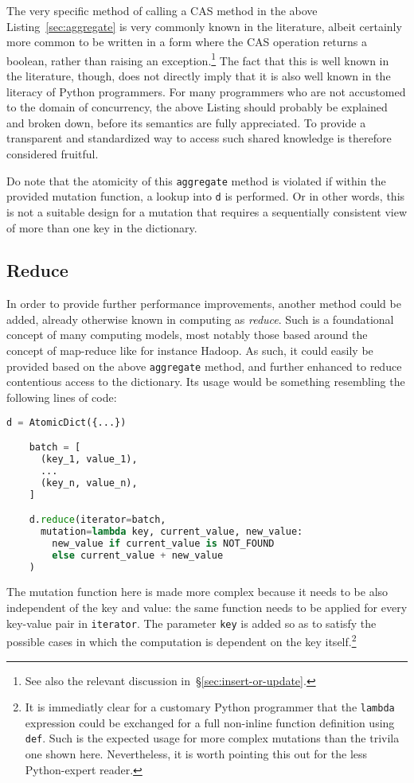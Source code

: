 The very specific method of calling a CAS method in the above Listing~\ref{sec:aggregate} is very commonly known in the literature, albeit certainly more common to be written in a form where the CAS operation returns a boolean, rather than raising an exception.\footnote{%
	See also the relevant discussion in~\S\ref{sec:insert-or-update}.
}
The fact that this is well known in the literature, though, does not directly imply that it is also well known in the literacy of Python programmers.
For many programmers who are not accustomed to the domain of concurrency, the above Listing should probably be explained and broken down, before its semantics are fully appreciated.
To provide a transparent and standardized way to access such shared knowledge is therefore considered fruitful.

Do note that the atomicity of this \texttt{aggregate} method is violated if within the provided mutation function, a lookup into \texttt{d} is performed.
Or in other words, this is not a suitable design for a mutation that requires a sequentially consistent view of more than one key in the dictionary.

\subsection{Reduce}\label{subsec:reduce}

In order to provide further performance improvements, another method could be added, already otherwise known in computing as \emph{reduce}.
Such is a foundational concept of many computing models, most notably those based around the concept of map-reduce like for instance Hadoop.
As such, it could easily be provided based on the above \texttt{aggregate} method, and further enhanced to reduce contentious access to the dictionary.
Its usage would be something resembling the following lines of code:
\begin{lstlisting}[label={lst:reduce-usage}, language=Python]
	d = AtomicDict({...})

	batch = [
	  (key_1, value_1),
	  ...
	  (key_n, value_n),
	]

	d.reduce(iterator=batch,
	  mutation=lambda key, current_value, new_value:
	    new_value if current_value is NOT_FOUND
	    else current_value + new_value
	)
\end{lstlisting}

The mutation function here is made more complex because it needs to be also independent of the key and value: the same function needs to be applied for every key-value pair in \texttt{iterator}.
The parameter \texttt{key} is added so as to satisfy the possible cases in which the computation is dependent on the key itself.\footnote{%
	It is immediatly clear for a customary Python programmer that the \texttt{lambda} expression could be exchanged for a full non-inline function definition using \texttt{def}.
	Such is the expected usage for more complex mutations than the trivila one shown here.
	Nevertheless, it is worth pointing this out for the less Python-expert reader.
}


